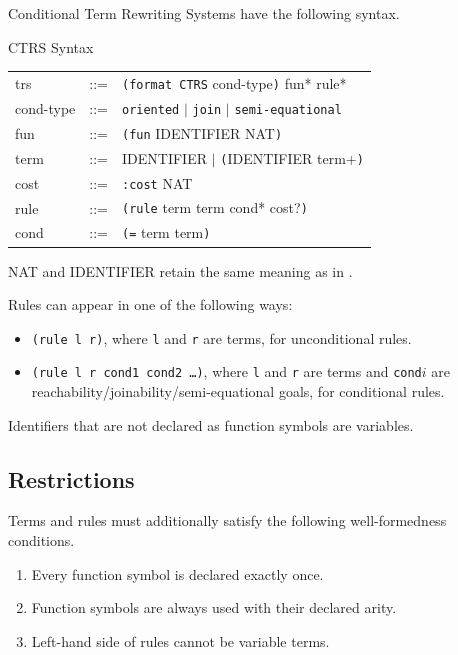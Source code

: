 Conditional Term Rewriting Systems have the following syntax.

\begin{grammar}{CTRS Syntax}
  \begin{tabular}{lll}
  trs & ::= & \texttt{(format CTRS} cond-type\texttt{)} fun* rule* \\
  cond-type & ::= & \texttt{oriented} $|$ \texttt{join} $|$ \texttt{semi-equational} \\
  fun & ::= & \texttt{(fun} IDENTIFIER NAT\texttt{)} \\
  term & ::= & IDENTIFIER $|$ \texttt{(}IDENTIFIER term+\texttt{)} \\
  cost & ::= & \texttt{:cost} NAT \\
  rule & ::= & \texttt{(rule} term term cond* cost?\texttt{)}\\
  cond & ::= & \texttt{(=} term term\texttt{)}
  \end{tabular}
\end{grammar}

NAT and IDENTIFIER retain the same meaning as in .

Rules can appear in one of the following ways:

\begin{itemize}
  \item \texttt{(rule l r)}, where \texttt{l} and \texttt{r} are terms, for unconditional rules.
  \item \texttt{(rule l r cond1 cond2 \ldots)}, where \texttt{l} and \texttt{r} are terms and \texttt{cond}$i$ are reachability/joinability/semi-equational goals, for conditional rules.
\end{itemize}

Identifiers that are not declared as function symbols are variables.

\subsection{Restrictions}

Terms and rules must additionally satisfy the following well-formedness conditions.
\begin{enumerate}
    \item Every function symbol is declared exactly once.
    \item Function symbols are always used with their declared arity.
    \item Left-hand side of rules cannot be variable terms.
\end{enumerate}

